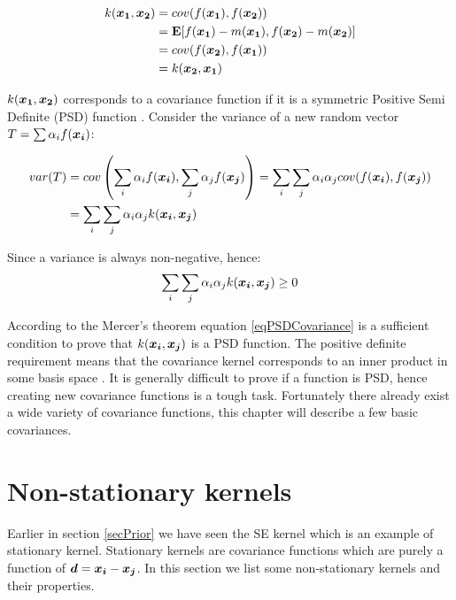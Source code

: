\begin{align}\label{eqSymmetricCovariance}
    k(\boldsymbol{x_{1}}, \boldsymbol{x_{2}}) & = cov(f(\boldsymbol{x_{1}}), f(\boldsymbol{x_{2}})) \\ 
                                & = \mathbf{E}[f(\boldsymbol{x_1}) - m(\boldsymbol{x_1}), f(\boldsymbol{x_2}) - m(\boldsymbol{x_2})] \\
                                & = cov(f(\boldsymbol{x_{2}}), f(\boldsymbol{x_{1}})) \\ 
                                & =  k(\boldsymbol{x_{2}}, \boldsymbol{x_{1}})
\end{align}

$k(\boldsymbol{x_{1}}, \boldsymbol{x_{2}})$ corresponds to a covariance function if it is a symmetric Positive Semi Definite (PSD) function \cite{mercer1909functions, loeve1978probability, durrande2001etude}. Consider the variance of a new random vector $T = \sum \alpha_{i}f(\boldsymbol{x_{i}})$:

\begin{equation}\label{eqDerivePSDCovariance}
    \begin{aligned}
        var(T) & = cov\left ( \sum_{i} \alpha_{i}f(\boldsymbol{x_{i}}), \sum_{j} \alpha_{j}f(\boldsymbol{x_{j}}) \right ) = \sum_{i}\sum_{j}\alpha_{i}\alpha_{j}cov(f(\boldsymbol{x_{i}}), f(\boldsymbol{x_{j}})) \\
& = \sum_{i}\sum_{j}\alpha_{i}\alpha_{j}k(\boldsymbol{x_{i}}, \boldsymbol{x_{j}})
    \end{aligned}
\end{equation}

Since a variance is always non-negative, hence:
\begin{equation}\label{eqPSDCovariance}
\sum_{i}\sum_{j}\alpha_{i}\alpha_{j}k(\boldsymbol{x_{i}}, \boldsymbol{x_{j}}) \geq 0
\end{equation}

According to the Mercer's theorem  \cite{mercer1909functions} equation \ref{eqPSDCovariance} is a sufficient condition to prove that $k(\boldsymbol{x_{i}}, \boldsymbol{x_{j}})$ is a PSD function. The positive definite requirement means that the covariance kernel corresponds to an inner product in some basis space \cite{bishop2006pattern}. It is generally difficult to prove if a function is PSD, hence creating new covariance functions is a tough task. Fortunately there already exist a wide variety of covariance functions, this chapter will describe a few basic covariances. 

\section{Non-stationary kernels}\label{secNonStationaryKernels}
Earlier in section \ref{secPrior} we have seen the SE kernel which is an example of stationary kernel. Stationary kernels are covariance functions which are purely a function of $\boldsymbol{d} = \boldsymbol{x_{i}} - \boldsymbol{x_{j}}$. In this section we list some non-stationary kernels and their properties. 

